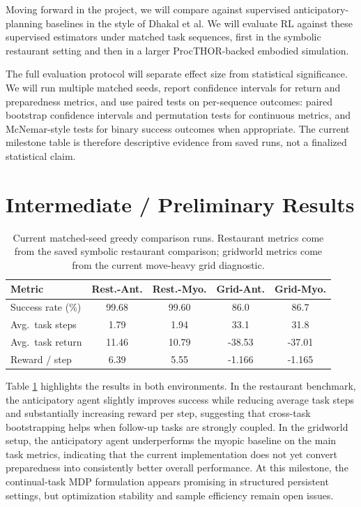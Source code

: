 \documentclass{article}
\begin{document}
Moving forward in the project, we will compare against supervised anticipatory-planning baselines in the style of Dhakal et al. We will evaluate RL against these supervised estimators under matched task sequences, first in the symbolic restaurant setting and then in a larger ProcTHOR-backed embodied simulation.

The full evaluation protocol will separate effect size from statistical significance. We will run multiple matched seeds, report confidence intervals for return and preparedness metrics, and use paired tests on per-sequence outcomes: paired bootstrap confidence intervals and permutation tests for continuous metrics, and McNemar-style tests for binary success outcomes when appropriate. The current milestone table is therefore descriptive evidence from saved runs, not a finalized statistical claim.

\section{Intermediate / Preliminary Results}
\begin{table}[t]
\centering
\small
\setlength{\tabcolsep}{4pt}
\begin{tabular}{lcccc}
\toprule
Metric & Rest.-Ant. & Rest.-Myo. & Grid-Ant. & Grid-Myo. \\
\midrule
Success rate (\%)   & 99.68 & 99.60 & 86.0  & 86.7 \\
Avg.\ task steps    & 1.79  & 1.94  & 33.1  & 31.8 \\
Avg.\ task return   & 11.46 & 10.79 & -38.53 & -37.01 \\
Reward / step       & 6.39  & 5.55  & -1.166 & -1.165 \\
\bottomrule
\end{tabular}
\caption{Current matched-seed greedy comparison runs. Restaurant metrics come from the saved symbolic restaurant comparison; gridworld metrics come from the current move-heavy grid diagnostic.}
\label{tab:results}
\end{table}

Table \ref{tab:results} highlights the results in both environments. In the restaurant benchmark, the anticipatory agent slightly improves success while reducing average task steps and substantially increasing reward per step, suggesting that cross-task bootstrapping helps when follow-up tasks are strongly coupled. In the gridworld setup, the anticipatory agent underperforms the myopic baseline on the main task metrics, indicating that the current implementation does not yet convert preparedness into consistently better overall performance. At this milestone, the continual-task MDP formulation appears promising in structured persistent settings, but optimization stability and sample efficiency remain open issues.

\clearpage
{}
\label{sec:refs}


\end{document}
